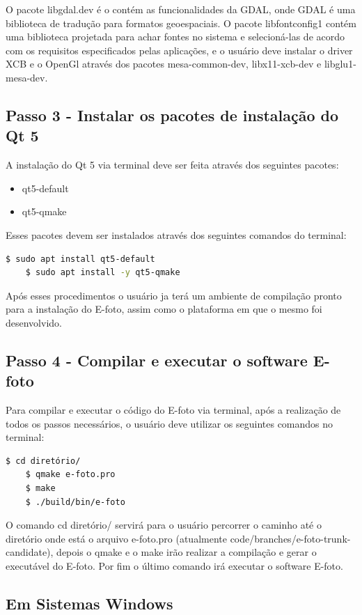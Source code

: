 O pacote libgdal.dev é o contém as funcionalidades da GDAL, onde GDAL é uma biblioteca de tradução para formatos geoespaciais. O pacote libfontconfig1 contém uma biblioteca projetada para achar fontes no sistema e selecioná-las de acordo com os requisitos especificados pelas aplicações, e o usuário deve instalar o driver XCB e o OpenGl através dos pacotes mesa-common-dev, libx11-xcb-dev e libglu1-mesa-dev. 
    
\subsection{Passo 3 - Instalar os pacotes de instalação do Qt 5}   
A instalação do Qt 5 via terminal deve ser feita através dos seguintes pacotes:
\begin{itemize}
	\item qt5-default
	\item qt5-qmake
\end{itemize}   
Esses pacotes devem ser instalados através dos seguintes comandos do terminal:
\begin{lstlisting}[language=bash]
	$ sudo apt install qt5-default
	$ sudo apt install -y qt5-qmake
\end{lstlisting}	
    
Após esses procedimentos o usuário ja terá um ambiente de compilação pronto para a instalação do E-foto, assim como o plataforma em que o mesmo foi desenvolvido.
    
\subsection{Passo 4 - Compilar e executar o software E-foto}
Para compilar e executar o código do E-foto via terminal, após a realização de todos os passos necessários, o usuário deve utilizar os seguintes comandos no terminal:
\begin{lstlisting}[language=bash]
   	$ cd diretório/
   	$ qmake e-foto.pro
   	$ make
   	$ ./build/bin/e-foto
\end{lstlisting}
   
O comando cd diretório/ servirá para o usuário percorrer o caminho até o diretório onde está o arquivo e-foto.pro (atualmente code/branches/e-foto-trunk-candidate), depois o qmake e o make irão realizar a compilação e gerar o executável do E-foto. Por fim o último comando irá executar o software E-foto.

\subsection{Em Sistemas Windows}

